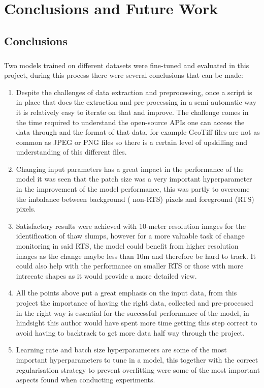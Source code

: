 \chapter{Conclusions and Future Work}
\section{Conclusions}
\paragraph{}
Two models trained on different datasets were fine-tuned and evaluated in this project, during this process there were several conclusions that can be made:
\begin{enumerate}
    \item{Despite the challenges of data extraction and preprocessing, once a script is in place that does the extraction and pre-processing in a semi-automatic way it is relatively easy to iterate on that and improve. The challenge comes in the time required to understand the open-source APIs one can access the data through and the format of that data, for example GeoTiff files are not as common as JPEG or PNG files so there is a certain level of upskilling and understanding of this different files.}
    
    \item{Changing input parameters has a great impact in the performance of the model it was seen that the patch size was a very important hyperparameter in the improvement of the model performance, this was partly to overcome the imbalance between background ( non-RTS) pixels and foreground (RTS) pixels.}
    
    \item{Satisfactory results were achieved with 10-meter resolution images for the identification of thaw slumps, however for a more valuable task of change monitoring in said RTS, the model could benefit from higher resolution images as the change maybe less than 10m and therefore be hard to track. It could also help with the performance on smaller \gls{RTS} or those with more intrecate shapes as it would provide a more detailed view.}
    
    \item{All the points above put a great emphasis on the input data, from this project the importance of having the right data, collected and pre-processed in the right way is essential for the successful performance of the model, in hindsight this author would have spent more time getting this step correct to avoid having to backtrack to get more data half way through the project.}
    
    \item{Learning rate and batch size hyperparameters are some of the most important hyperparameters to tune in a model, this together with the correct regularisation strategy to prevent overfitting were some of the most important aspects found when conducting experiments.}
\end{enumerate}

